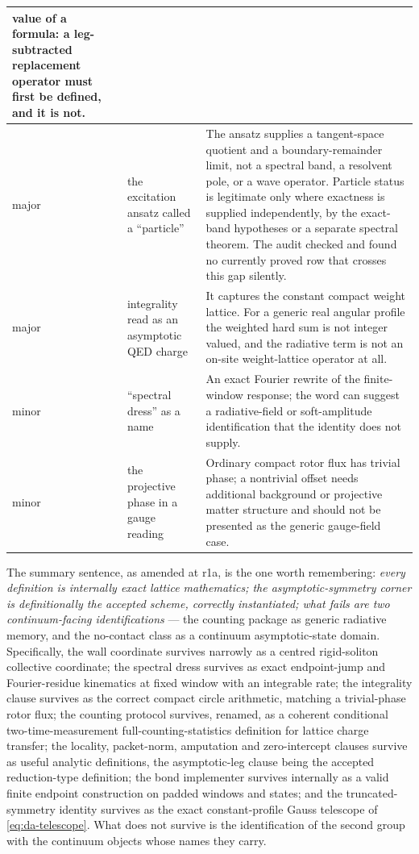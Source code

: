 \begin{center}
\begin{tabular}{@{}p{}p{}p{}@{}}
value of a formula: a leg-subtracted replacement operator must first be defined,
and it is not. \\
\midrule
major &
the excitation ansatz called a ``particle'' &
The ansatz supplies a tangent-space quotient and a boundary-remainder limit, not
a spectral band, a resolvent pole, or a wave operator. Particle status is
legitimate only where exactness is supplied independently, by the exact-band
hypotheses or a separate spectral theorem. The audit checked and found no
currently proved row that crosses this gap silently. \\
\midrule
major &
integrality read as an asymptotic QED charge &
It captures the constant compact weight lattice. For a generic real angular
profile the weighted hard sum is not integer valued, and the radiative term is
not an on-site weight-lattice operator at all. \\
\midrule
minor &
``spectral dress'' as a name &
An exact Fourier rewrite of the finite-window response; the word can suggest a
radiative-field or soft-amplitude identification that the identity does not
supply. \\
\midrule
minor &
the projective phase in a gauge reading &
Ordinary compact rotor flux has trivial phase; a nontrivial offset needs
additional background or projective matter structure and should not be
presented as the generic gauge-field case. \\
\bottomrule
\end{tabular}
\end{center}

\begin{observation}
\label{obs:da-survivors}
The summary sentence, as amended at r1a, is the one worth remembering:
\emph{every definition is internally exact lattice mathematics; the
asymptotic-symmetry corner is definitionally the accepted scheme, correctly
instantiated; what fails are two continuum-facing identifications} --- the
counting package as generic radiative memory, and the no-contact class as a
continuum asymptotic-state domain. Specifically, the wall coordinate survives narrowly as a
centred rigid-soliton collective coordinate; the spectral dress survives as
exact endpoint-jump and Fourier-residue kinematics at fixed window with an
integrable rate; the integrality clause survives as the correct compact circle
arithmetic, matching a trivial-phase rotor flux; the counting protocol survives,
renamed, as a coherent conditional two-time-measurement full-counting-statistics
definition for lattice charge transfer; the locality, packet-norm, amputation
and zero-intercept clauses survive as useful analytic definitions, the
asymptotic-leg clause being the accepted reduction-type definition; the bond
implementer survives internally as a valid finite endpoint construction on
padded windows and states; and the truncated-symmetry identity survives as the
exact constant-profile Gauss telescope of \eqref{eq:da-telescope}. What does
not survive is the identification of the second group with the continuum objects
whose names they carry.
\end{observation}

